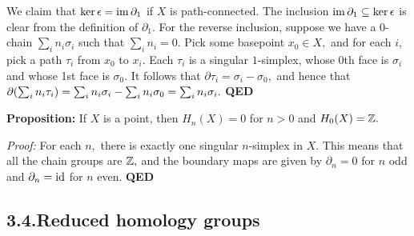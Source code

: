 \documentclass{article}
\begin{document}
We claim that $\ker \epsilon = \operatorname{im} \partial_1$ if $X$ is path-connected. The inclusion $\operatorname{im} \partial_1 \subseteq \ker \epsilon$ is clear from the definition of $\partial_1.$ For the reverse inclusion, suppose we have a $0$-chain $\sum_i n_i \sigma_i$ such that $\sum_i n_i = 0.$ Pick some basepoint $x_0 \in X,$ and for each $i,$ pick a path $\tau_i$ from $x_0$ to $x_i.$ Each $\tau_i$ is a singular $1$-simplex, whose 0th face is $\sigma_i$ and whose 1st face is $\sigma_0.$ It follows that $\partial \tau_i = \sigma_i - \sigma_0,$ and hence that $\partial\qty(\sum_i n_i \tau_i) = \sum_i n_i \sigma_i - \sum_i n_i \sigma_0 = \sum_i n_i \sigma_i.$ \textbf{QED}%

\textbf{Proposition:} If $X$ is a point, then $H_n(X) = 0$ for $n > 0$ and $H_0(X) = \mathbb{Z}.$%

\emph{Proof:} For each $n,$ there is exactly one singular $n$-simplex in $X.$ This means that all the chain groups are $\mathbb{Z},$ and the boundary maps are given by $\partial_n = 0$ for $n$ odd and $\partial_n = \operatorname{id}$ for $n$ even. \textbf{QED}%

\subsection{3.4.\hspace*{0.5em}Reduced homology groups}\label{sec-reduced-homology-groups}%
\end{document}
